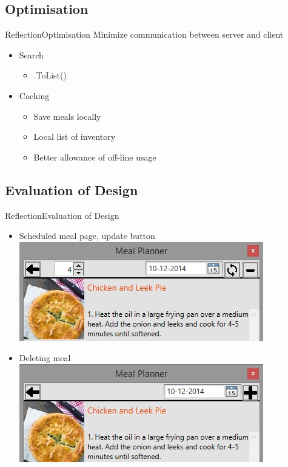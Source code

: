 \subsection{Optimisation}
\begin{frame}{Reflection}{Optimisation}
	Minimize communication between server and client
	\begin{itemize}
		\item Search
		\begin{itemize}
			\item .ToList()
		\end{itemize}
		\item Caching
		\begin{itemize}
			\item Save meals locally
			\item Local list of inventory
			\item Better allowance of off-line usage
		\end{itemize}
	\end{itemize}
\end{frame}

\subsection{Evaluation of Design}
\begin{frame}{Reflection}{Evaluation of Design}
	\begin{itemize}
		\item Scheduled meal page, update button
		\newline \includegraphics[scale=0.4]{./graphics/datepicker}
		\item Deleting meal
		\newline \includegraphics[scale=0.4]{./graphics/datepicker-not-planned}
	\end{itemize}
\end{frame}

